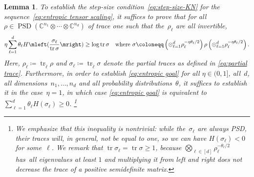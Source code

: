 \documentclass[11pt,letterpaper]{article}
\newtheorem{lemma}[theorem]{Lemma}\AddToHook{env/lemma/begin}{\crefalias{theorem}{lemma}}
\numberwithin{equation}{section}
\newcommand{\ot}{\otimes}
\newcommand{\CC}{\mathbb{C}}
\DeclareMathOperator{\PSD}{PSD}
\DeclareMathOperator{\tr}{tr}
\begin{document}
\begin{lemma}\label{lem:quantum reduction}
    To establish the step-size condition~\eqref{eq:step-size-KN} for the sequence~\eqref{eq:entropic tensor scaling}, it suffices to prove that
    for all $\rho \in \PSD(\CC^{n_1} \ot \cdots \ot \CC^{n_d})$ of trace one such that the~$\rho_\ell$ are all invertible,
    \begin{equation}\label{eq:entropic goal}
        \eta \sum_{\ell=1}^d \theta_\ell H\mleft(\frac {\sigma_\ell}{\tr\sigma}\mright) \geq \log \tr \sigma
        \quad\text{where } \sigma \coloneqq \left( \ot_{\ell=1}^d \rho_\ell^{-\eta\theta_\ell/2} \right) \rho \left( \ot_{\ell=1}^d \rho_\ell^{-\eta\theta_\ell/2} \right).
    \end{equation}
    Here, $\rho_\ell \coloneqq \tr_{\check\ell}\rho$ and $\sigma_\ell \coloneqq \tr_{\check\ell} \sigma$ denote the partial traces as defined in \cref{eq:partial trace}.
    Furthermore, in order to establish \cref{eq:entropic goal} for all $\eta\in(0,1]$, all~$d$, all dimensions~$n_1,\dots,n_d$ and all probability distributions~$\theta$, it suffices to establish it in the case~$\eta=1$, in which case \cref{eq:entropic goal} is equivalent to $\sum_{\ell=1}^d \theta_\ell H(\sigma_\ell) \geq 0$.%
\footnote{We emphasize that this inequality is nontrivial: while the~$\sigma_\ell$ are always PSD, their traces will, in general, not be equal to one, so we can have $H(\sigma_\ell) < 0$ for some~$\ell$.
We remark that $\tr\sigma_\ell = \tr\sigma \geq 1$, because $\bigotimes_{\ell\in[d]}\rho_\ell^{-\theta_\ell/2}$ has~all eigenvalues at least $1$ and multiplying it from left and right does not decrease the trace of a positive semidefinite matrix.}
\end{lemma}
\end{document}
